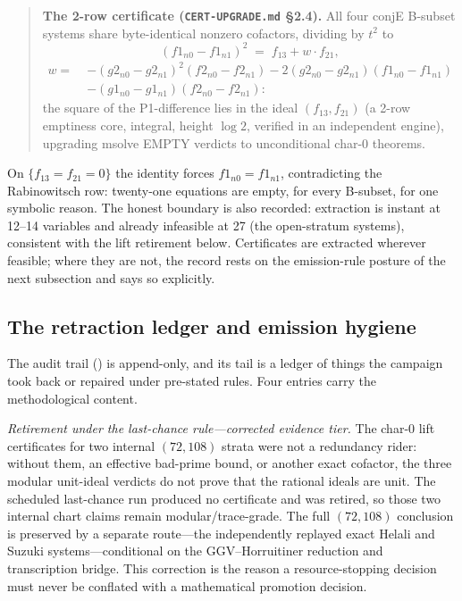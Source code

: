 \documentclass[11pt]{article}
\theoremstyle{definition}
\theoremstyle{remark}
\begin{document}
\begin{quote}
\textbf{The 2-row certificate (\texttt{CERT-UPGRADE.md} \S2.4).} All four conjE B-subset systems share byte-identical nonzero cofactors, dividing by $t^2$ to
\[
(f1_{n0}-f1_{n1})^2\;=\;f_{13}+w\cdot f_{21},
\]
\[
\begin{aligned}
w=\;&-(g2_{n0}-g2_{n1})^2(f2_{n0}-f2_{n1})-2(g2_{n0}-g2_{n1})(f1_{n0}-f1_{n1})\\
&-(g1_{n0}-g1_{n1})(f2_{n0}-f2_{n1}):
\end{aligned}
\]
the square of the P1-difference lies in the ideal $(f_{13},f_{21})$ (a 2-row emptiness core, integral, height $\log 2$, verified in an independent engine), upgrading msolve EMPTY verdicts to unconditional char-0 theorems.
\end{quote}

\noindent On $\{f_{13}=f_{21}=0\}$ the identity forces $f1_{n0}=f1_{n1}$, contradicting the Rabinowitsch row: twenty-one equations are empty, for every B-subset, for one symbolic reason. The honest boundary is also recorded: extraction is instant at 12--14 variables and already infeasible at 27 (the open-stratum systems), consistent with the lift retirement below. Certificates are extracted wherever feasible; where they are not, the record rests on the emission-rule posture of the next subsection and says so explicitly.

\subsection{The retraction ledger and emission hygiene}\label{sec:ledger}

The audit trail () is append-only, and its tail is a ledger of things the campaign took back or repaired under pre-stated rules. Four entries carry the methodological content.

\emph{Retirement under the last-chance rule---corrected evidence tier.} The char-$0$ lift certificates for two internal $(72,108)$ strata were not a redundancy rider: without them, an effective bad-prime bound, or another exact cofactor, the three modular unit-ideal verdicts do not prove that the rational ideals are unit. The scheduled last-chance run produced no certificate and was retired, so those two internal chart claims remain modular/trace-grade. The full $(72,108)$ conclusion is preserved by a separate route---the independently replayed exact Helali and Suzuki systems---conditional on the GGV--Horruitiner reduction and transcription bridge. This correction is the reason a resource-stopping decision must never be conflated with a mathematical promotion decision.
\end{document}
